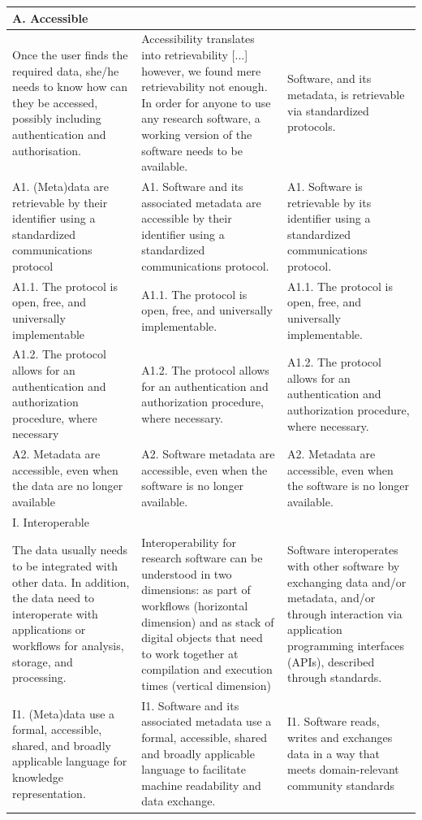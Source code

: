 {\begin{longtable}{@{\extracolsep{\fill}} p{6cm}   p{6cm}  p{6cm}}
\hline
\multicolumn{2}{l}{A. Accessible} &  \\
\hline
Once the user finds the required data, she/he needs to know how can they be accessed, possibly including authentication and authorisation. & Accessibility translates into retrievability {[}...{]} however, we found mere retrievability not enough. In order for anyone to use any research software, a working version of the software needs to be available. & Software, and its metadata, is retrievable via standardized protocols. \\
\hline
A1. (Meta)data are retrievable by their identifier using a standardized communications protocol & A1. Software and its associated metadata are accessible by their identifier using a standardized communications protocol. & A1. Software is retrievable by its identifier using a standardized communications protocol. \\
\hline
A1.1. The protocol is open, free, and universally implementable & A1.1. The protocol is open, free, and universally implementable. & A1.1. The protocol is open, free, and universally implementable. \\
\hline
A1.2. The protocol allows for an authentication and authorization procedure, where necessary & A1.2. The protocol allows for an authentication and authorization procedure, where necessary. & A1.2. The protocol allows for an authentication and authorization procedure, where necessary. \\
\hline
A2. Metadata are accessible, even when the data are no longer available & A2. Software metadata are accessible, even when the software is no longer available. & A2. Metadata are accessible, even when the software is no longer available. \\
\hline
\multicolumn{2}{l}{I. Interoperable} &  \\
\hline
The data usually needs to be integrated with other data. In addition, the data need to interoperate with applications or workflows for analysis, storage, and processing. & Interoperability for research software can be understood in two dimensions: as part of workflows (horizontal dimension) and as stack of digital objects that need to work together at compilation and execution times (vertical dimension) & Software interoperates with other software by exchanging data and/or metadata, and/or through interaction via application programming interfaces (APIs), described through standards. \\
\hline
I1. (Meta)data use a formal, accessible, shared, and broadly applicable language for knowledge representation. & I1. Software and its associated metadata use a formal, accessible, shared and broadly applicable language to facilitate machine readability and data exchange. & I1. Software reads, writes and exchanges data in a way that meets domain-relevant community standards \\

\end{longtable}}
